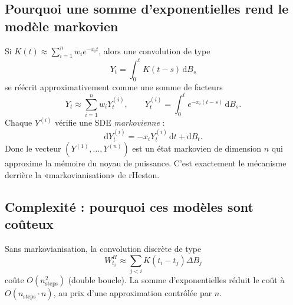 \documentclass[11pt,a4paper]{report}
\theoremstyle{definition}
\theoremstyle{plain}
\theoremstyle{remark}
\newcommand{\dd}{\mathrm{d}}
\newcommand{\1}{\mathbf{1}}
\begin{document}
\subsection*{Pourquoi une somme d'exponentielles rend le modèle markovien}
Si $K(t)\approx \sum_{i=1}^n w_ie^{-x_it}$, alors une convolution de type
\[
Y_t=\int_0^t K(t-s)\,\dd B_s
\]
se réécrit approximativement comme une somme de facteurs
\[
Y_t\approx \sum_{i=1}^n w_i Y_t^{(i)},\qquad Y_t^{(i)}=\int_0^t e^{-x_i(t-s)}\,\dd B_s.
\]
Chaque $Y^{(i)}$ vérifie une SDE \emph{markovienne} :
\[
\dd Y_t^{(i)}=-x_i Y_t^{(i)}\,\dd t+\dd B_t.
\]
Donc le vecteur $(Y^{(1)},\ldots,Y^{(n)})$ est un état markovien de dimension $n$ qui approxime la mémoire du noyau de puissance.
C'est exactement le mécanisme derrière la «markovianisation» de rHeston.

\subsection*{Complexité : pourquoi ces modèles sont coûteux}
Sans markovianisation, la convolution discrète de type
\[
W_{t_i}^H \approx \sum_{j<i} K(t_i-t_j)\Delta B_j
\]
coûte $O(n_{\text{steps}}^2)$ (double boucle).
La somme d'exponentielles réduit le coût à $O(n_{\text{steps}}\cdot n)$, au prix d'une approximation contrôlée par $n$.
\end{document}
